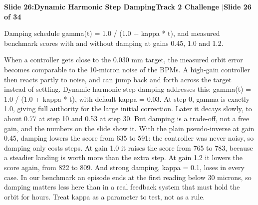 \documentclass[11pt,a4paper]{article}
\begin{document}
\noindent\begin{tcolorbox}[colback=navy,colframe=navy,left=6pt,right=6pt,top=3pt,bottom=3pt,boxrule=0pt,arc=2pt]
{\large\bfseries\color{white}Slide 26:\enspace Dynamic Harmonic Step Damping}\hfill{\footnotesize\bfseries\color{white!85!lightbg}Track 2 Challenge \enspace$|$\enspace Slide 26 of 34}
\end{tcolorbox}
\vspace{0.2em}
\begin{tcolorbox}[colback=lightbg,colframe=bordergray,title={\footnotesize\bfseries\color{darkgray}Slide Visual Blueprint},fontupper=\small,left=6pt,right=6pt,top=2.5pt,bottom=2.5pt,boxrule=0.6pt,arc=2.5pt]
Damping schedule gamma(t) = 1.0 / (1.0 + kappa * t), and measured benchmark scores with and without damping at gains 0.45, 1.0 and 1.2.
\end{tcolorbox}
\vspace{0.2em}
\begin{tcolorbox}[colback=white,colframe=primaryblue,title={\footnotesize\bfseries\color{white}Spoken Presenter Script},fontupper=\small,left=6pt,right=6pt,top=3pt,bottom=3pt,boxrule=0.8pt,arc=2.5pt]
When a controller gets close to the 0.030 mm target, the measured orbit error becomes comparable to the 10-micron noise of the BPMs. A high-gain controller then reacts partly to noise, and can jump back and forth across the target instead of settling. Dynamic harmonic step damping addresses this: gamma(t) = 1.0 / (1.0 + kappa * t), with default kappa = 0.03. At step 0, gamma is exactly 1.0, giving full authority for the large initial correction. Later it decays slowly, to about 0.77 at step 10 and 0.53 at step 30. But damping is a trade-off, not a free gain, and the numbers on the slide show it. With the plain pseudo-inverse at gain 0.45, damping lowers the score from 635 to 591: the controller was never noisy, so damping only costs steps. At gain 1.0 it raises the score from 765 to 783, because a steadier landing is worth more than the extra step. At gain 1.2 it lowers the score again, from 822 to 809. And strong damping, kappa = 0.1, loses in every case. In our benchmark an episode ends at the first reading below 30 microns, so damping matters less here than in a real feedback system that must hold the orbit for hours. Treat kappa as a parameter to test, not as a rule.
\end{tcolorbox}
\vspace{0.2em}
\end{document}

